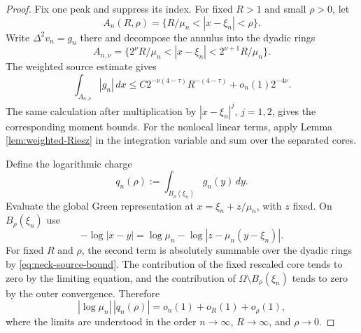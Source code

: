 \documentclass[11pt]{article}
\numberwithin{equation}{section}
\begin{document}
\begin{proof}
Fix one peak and suppress its index. For fixed $R>1$ and small
$\rho>0$, let
\[
A_n(R,\rho)
=\{R/\mu_n<|x-\xi_n|<\rho\}.
\]
Write $\Delta^2v_n=g_n$ there and decompose the annulus into the
dyadic rings
\[
A_{n,\nu}
=\{2^\nu R/\mu_n<|x-\xi_n|
<2^{\nu+1}R/\mu_n\}.
\]
The weighted source estimate gives
\begin{equation}\label{eq:neck-source-bound}
\int_{A_{n,\nu}}|g_n|\,dx
\leq
C2^{-\nu(4-\tau)}R^{-(4-\tau)}
+o_n(1)2^{-4\nu}.
\end{equation}
The same calculation after multiplication by
$|x-\xi_n|^j$, $j=1,2$, gives the corresponding moment bounds. For
the nonlocal linear terms, apply Lemma \ref{lem:weighted-Riesz} in
the integration variable and sum over the separated cores.

Define the logarithmic charge
\[
q_n(\rho):=\int_{B_\rho(\xi_n)}g_n(y)\,dy.
\]
Evaluate the global Green representation at
$x=\xi_n+z/\mu_n$, with $z$ fixed. On $B_\rho(\xi_n)$ use
\[
-\log|x-y|
=\log\mu_n-\log|z-\mu_n(y-\xi_n)|.
\]
For fixed $R$ and $\rho$, the second term is absolutely summable over
the dyadic rings by \eqref{eq:neck-source-bound}. The contribution of
the fixed rescaled core tends to zero by the limiting equation, and
the contribution of $\Omega\setminus B_\rho(\xi_n)$ tends to zero by
the outer convergence. Therefore
\begin{equation}\label{eq:neck-charge}
|\log\mu_n|\,|q_n(\rho)|
=o_n(1)+o_R(1)+o_\rho(1),
\end{equation}
where the limits are understood in the order
$n\to\infty$, $R\to\infty$, and $\rho\to0$.


\end{proof}
\end{document}

